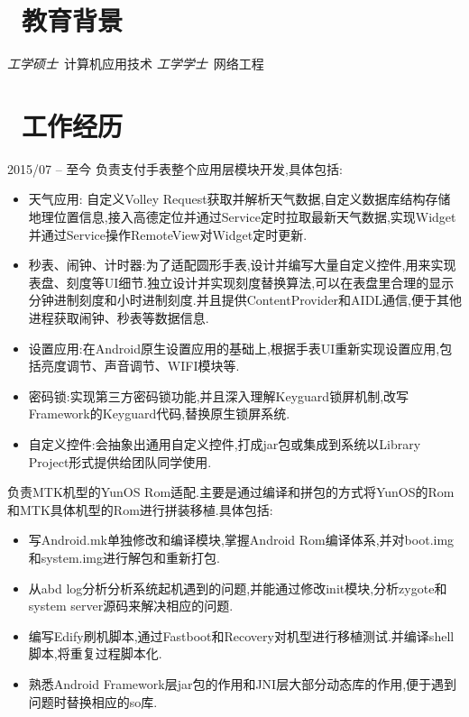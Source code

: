 \documentclass{resume}
\begin{document}


 
\section{\faGraduationCap\  教育背景}
\textit{工学硕士}\ 计算机应用技术
\textit{工学学士}\ 网络工程


\section{\faUsers\ 工作经历}
 {2015/07 -- 至今}
负责支付手表整个应用层模块开发,具体包括:
\begin{itemize}
  \item 天气应用: 自定义Volley Request获取并解析天气数据,自定义数据库结构存储地理位置信息,接入高德定位并通过Service定时拉取最新天气数据,实现Widget并通过Service操作RemoteView对Widget定时更新.
  \item 秒表、闹钟、计时器:为了适配圆形手表,设计并编写大量自定义控件,用来实现表盘、刻度等UI细节.独立设计并实现刻度替换算法,可以在表盘里合理的显示分钟进制刻度和小时进制刻度.并且提供ContentProvider和AIDL通信,便于其他进程获取闹钟、秒表等数据信息. 
  \item 设置应用:在Android原生设置应用的基础上,根据手表UI重新实现设置应用,包括亮度调节、声音调节、WIFI模块等.
  \item 密码锁:实现第三方密码锁功能,并且深入理解Keyguard锁屏机制,改写Framework的Keyguard代码,替换原生锁屏系统.
  \item 自定义控件:会抽象出通用自定义控件,打成jar包或集成到系统以Library Project形式提供给团队同学使用.
\end{itemize}

\begin{onehalfspacing}
负责MTK机型的YunOS Rom适配.主要是通过编译和拼包的方式将YunOS的Rom和MTK具体机型的Rom进行拼装移植.具体包括:
\begin{itemize}
  \item 写Android.mk单独修改和编译模块,掌握Android Rom编译体系,并对boot.img和system.img进行解包和重新打包.
  \item 从abd log分析分析系统起机遇到的问题,并能通过修改init模块,分析zygote和system server源码来解决相应的问题.
  \item 编写Edify刷机脚本,通过Fastboot和Recovery对机型进行移植测试.并编译shell脚本,将重复过程脚本化.
  \item 熟悉Android Framework层jar包的作用和JNI层大部分动态库的作用,便于遇到问题时替换相应的so库.
\end{itemize}
\end{onehalfspacing}
\end{document}
